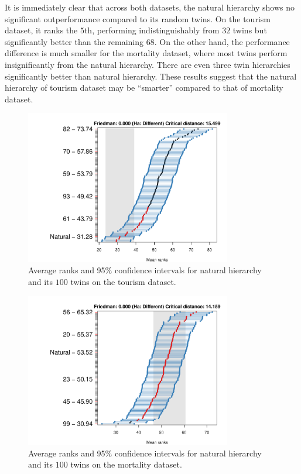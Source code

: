\documentclass[a4paper,review,12pt,authoryear]{elsarticle}
\begin{document}
It is immediately clear that across both datasets, the natural hierarchy shows no significant outperformance compared to its random twins. 
On the tourism dataset, it ranks the $5$th, performing indistinguishably from $32$ twins but significantly better than the remaining $68$.
On the other hand, the performance difference is much smaller for the mortality dataset, where most twins perform insignificantly from the natural hierarchy. There are even three twin hierarchies significantly better than natural hierarchy.
These results suggest that the natural hierarchy of tourism dataset may be ``smarter'' compared to that of mortality dataset.


\begin{figure}[!ht]
    \centering
    \includegraphics[width=0.8\textwidth]{figures/hierarchy_rmsse/tourism/P2_natural_vs_pn_h12.pdf}
    \caption{\label{fig:P2_tourism}Average ranks and 95\% confidence intervals for natural hierarchy and its $100$ twins on the tourism dataset.}
\end{figure}

\begin{figure}[!ht]
    \centering    \includegraphics[width=0.8\textwidth]{figures/hierarchy_rmsse/mortality/P2_natural_vs_pn_h12.pdf}
    \caption{\label{fig:P2_mortality}Average ranks and 95\% confidence intervals for natural hierarchy and its $100$ twins on the mortality dataset.}
\end{figure}
\end{document}
